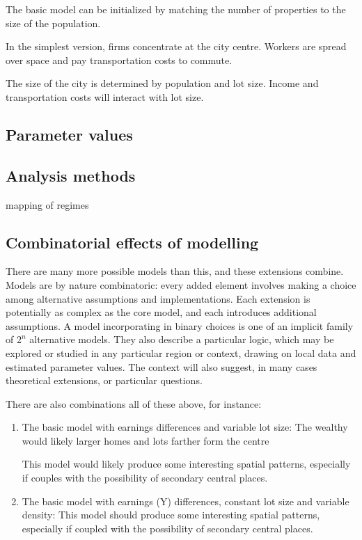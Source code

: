 The basic model can be initialized by matching the number of properties to the size of the population. 

In the simplest version, firms concentrate at the city centre. Workers are spread over space and pay transportation costs to commute.

The size of the city is determined by population and lot size. Income and transportation costs will interact with lot size. 

\subsection{Parameter values}

\subsection{Analysis methods}
mapping of regimes






\subsection{Combinatorial effects of modelling}

There are many more possible models than this, and these extensions combine. Models are by nature combinatoric: every added element involves making a choice among alternative assumptions and implementations. Each extension is potentially as complex as the core model, and each introduces additional assumptions.  A model incorporating in binary choices is one of an implicit family of $2^n$ alternative models. 
They also describe a particular logic, which may be explored or studied in any particular region or context, drawing on local data and estimated parameter values. The context will also suggest, in many cases theoretical extensions, or particular questions.


There are also combinations all of these above, for instance:

\begin{enumerate}

\item  The basic model with earnings differences and variable lot size: 
The wealthy would likely larger homes and lots farther form the centre

This model would likely produce some interesting spatial patterns, especially if couples with the possibility of secondary central places.

\item The basic model with earnings (Y) differences, constant lot size and variable density: This model should produce some interesting spatial patterns, especially if coupled with the possibility of secondary central places.

\end{enumerate}

